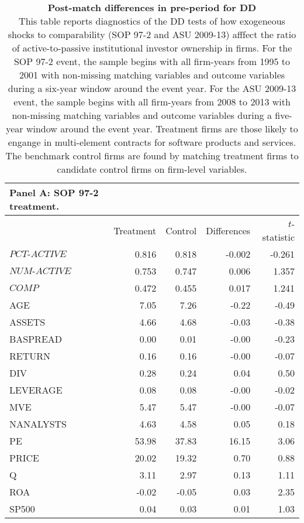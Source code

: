 
\centering
\begin{longtable}{lrrrr} 
\caption[\textbf{Post-match differences in pre-period for DD}]{\textbf{Post-match differences in pre-period for DD}\\
\footnotesize This table reports diagnostics of the DD tests of how exogeneous shocks to comparability (SOP 97-2 and ASU 2009-13) afffect the ratio of active-to-passive institutional investor ownership in firms. For the SOP 97-2 event, the sample begins with all firm-years from 1995 to 2001 with non-missing matching variables and outcome variables during a six-year window around the event year. For the ASU 2009-13 event, the sample begins with all firm-years from 2008 to 2013 with non-missing matching variables and outcome variables during a five-year window around the event year. Treatment firms are those likely to engange in multi-element contracts for software products and services. The benchmark control firms are found by matching treatment firms to candidate control firms on firm-level variables.}\label{post-match} \\
  \hline
  \hline
  Panel A: SOP 97-2 treatment.\\
  \hline
  \endfirsthead
 & Treatment & Control & Differences & $t$-statistic \\ 
  \hline
  \endhead
  $PCT\text{-}ACTIVE$ & 0.816 & 0.818 & -0.002 & -0.261 \\
  $NUM\text{-}ACTIVE$ & 0.753 & 0.747 & 0.006 & 1.357 \\
  $COMP$ & 0.472 & 0.455 & 0.017 & 1.241\\
AGE & 7.05 & 7.26 & -0.22 & -0.49 \\ 
  ASSETS & 4.66 & 4.68 & -0.03 & -0.38 \\ 
  BASPREAD & 0.00 & 0.01 & -0.00 & -0.23 \\ 
  RETURN & 0.16 & 0.16 & -0.00 & -0.07 \\ 
  DIV & 0.28 & 0.24 & 0.04 & 0.50 \\ 
  LEVERAGE & 0.08 & 0.08 & -0.00 & -0.02 \\ 
  MVE & 5.47 & 5.47 & -0.00 & -0.07 \\ 
  NANALYSTS & 4.63 & 4.58 & 0.05 & 0.18 \\ 
  PE & 53.98 & 37.83 & 16.15 & 3.06 \\ 
  PRICE & 20.02 & 19.32 & 0.70 & 0.88 \\ 
  Q & 3.11 & 2.97 & 0.13 & 1.11 \\ 
  ROA & -0.02 & -0.05 & 0.03 & 2.35 \\ 
  SP500 & 0.04 & 0.03 & 0.01 & 1.03 \\ 

\end{longtable}
